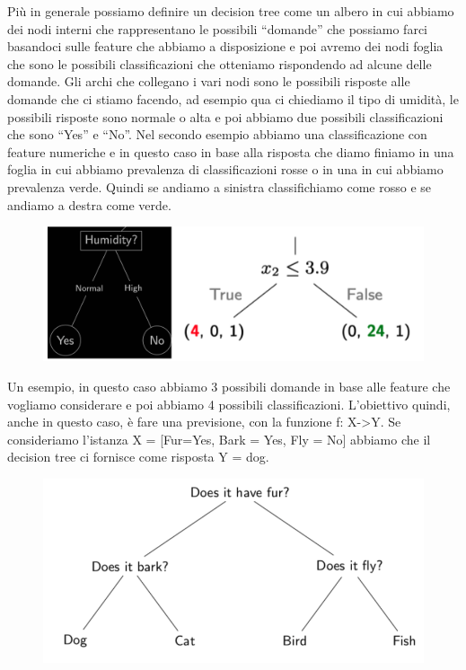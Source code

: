 \documentclass[14pt]{extreport}
\begin{document}
	Più in generale possiamo definire un decision tree come un albero in cui abbiamo dei nodi interni che rappresentano le possibili “domande” che possiamo farci basandoci sulle feature che abbiamo a disposizione e poi avremo dei nodi foglia che sono le possibili classificazioni che otteniamo rispondendo ad alcune delle domande.
	Gli archi che collegano i vari nodi sono le possibili risposte alle domande che ci stiamo facendo, ad esempio qua ci chiediamo il tipo di umidità, le possibili risposte sono normale o alta e poi abbiamo due possibili classificazioni che sono “Yes” e “No”.
	Nel secondo esempio abbiamo una classificazione con feature numeriche e in questo caso in base alla risposta che diamo finiamo in una foglia in cui abbiamo prevalenza di classificazioni rosse o in una in cui abbiamo prevalenza verde. 
	Quindi se andiamo a sinistra classifichiamo come rosso e se andiamo a destra come verde.


\begin{figure}[H] 
	\centering
	\includegraphics[width=0.7\linewidth]{477.jpeg}
	\end{figure}

	Un esempio, in questo caso abbiamo 3 possibili domande in base alle feature che vogliamo considerare e poi abbiamo 4 possibili classificazioni. 
	L’obiettivo quindi, anche in questo caso, è fare una previsione, con la funzione 
	f: X->Y.
	Se consideriamo l’istanza X = [Fur=Yes, Bark = Yes, Fly = No] abbiamo che il decision tree ci fornisce come risposta Y = dog.



	\begin{figure}[H] 
		\centering
		\includegraphics[width=0.7\linewidth]{478.jpeg}
		\end{figure}
\end{document}
